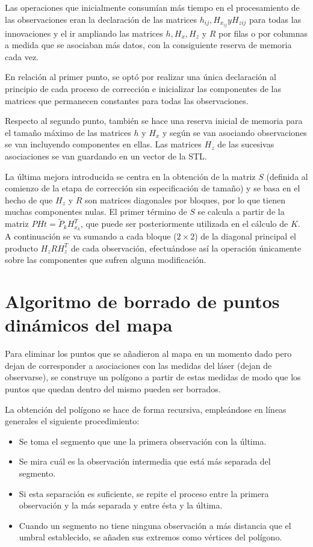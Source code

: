 Las operaciones que inicialmente consumían más tiempo en el procesamiento de las observaciones eran la declaración de las matrices $h_{ij}, H_{x_{ij}} y H_{z{ij}}$ para todas las innovaciones y el ir ampliando las matrices $h, H_{x}, H_{z}$ y $R$ por filas o por columnas a medida que se asociaban más datos, con la consiguiente reserva de memoria cada vez.

En relación al primer punto, se optó por realizar una única declaración al principio de cada proceso de corrección e inicializar las componentes de las matrices que permanecen constantes para todas las observaciones.

Respecto al segundo punto, también se hace una reserva inicial de memoria para el tamaño máximo de las matrices $h$ y $H_{x}$ y según se van asociando observaciones se van incluyendo componentes en ellas. Las matrices $H_{z}$ de las sucesivas asociaciones se van guardando en un vector de la STL.

La última mejora introducida se centra en la obtención de la matriz $S$ (definida al comienzo de la etapa de corrección sin especificación de tamaño) y se basa en el hecho de que $H_{z}$ y $R$ son matrices diagonales por bloques, por lo que tienen muchas componentes nulas. El primer término de $S$ se calcula a partir de la matriz $PHt = \tilde{P}_{k}H_{x_{k}}^{T}$, que puede ser posteriormente utilizada en el cálculo de $K$. A continuación se va sumando a cada bloque ($2 \times 2$) de la diagonal principal el producto $H_{z}RH_{z}^{T}$ de cada observación, efectuándose así la operación únicamente sobre las componentes que sufren alguna modificación.

\section{Algoritmo de borrado de puntos dinámicos del mapa} \label{poligono}
Para eliminar los puntos que se añadieron al mapa en un momento dado pero dejan de corresponder a asociaciones con las medidas del láser (dejan de observarse), se construye un polígono a partir de estas medidas de modo que los puntos que quedan dentro del mismo pueden ser borrados.

La obtención del polígono se hace de forma recursiva, empleándose en líneas generales el siguiente procedimiento:
\begin{itemize}
  \item Se toma el segmento que une la primera observación con la última.
  \item Se mira cuál es la observación intermedia que está más separada del segmento.
  \item Si esta separación es suficiente, se repite el proceso entre la primera observación y la más separada y entre ésta y la última.
  \item Cuando un segmento no tiene ninguna observación a más distancia que el umbral establecido, se añaden sus extremos como vértices del polígono.
\end{itemize}

